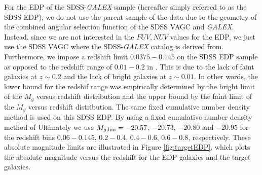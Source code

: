 \documentclass{emulateapj}
\begin{document}
For the EDP of the SDSS-{\em GALEX} sample (hereafter simply referred to as the SDSS EDP), 
we do not use the parent sample of the data due to 
the geometry of the combined angular selection function of the SDSS VAGC and {\em GALEX}. 
Instead, since we are not interested in the $FUV, NUV$ values for the EDP, we just use the
SDSS VAGC where the SDSS-{\em GALEX} catalog is derived from. 
Furthermore, we impose a redshift limit $0.0375-0.145$ on the SDSS EDP sample as opposed 
to the redshift range of $0.01-0.2$ in \cite{Moustakas:20133aa}.
This is due to the lack of faint galaxies at $z \sim 0.2$ and the lack of bright 
galaxies at $z \sim 0.01$. 
In other words, the lower bound for the redshif range was empirically determined by the bright limit of 
the $M_{g}$ versus redshift distribution and the upper bound by the faint limit of the 
$M_{g}$ versus redshift distribution. 
The same fixed cumulative number density method is used on this SDSS EDP. 
By using a fixed cumulative number density method of 
Ultimately we use $M_{g,\rm{lim}} = -20.57$, $-20.73$, $-20.80$ and $-20.95$ for the redshift bins 
$0.06-0.145$, $0.2-0.4$, $0.4-0.6$, $0.6-0.8$, respectively. 
These absolute magnitude limits are illustrated in Figure \ref{fig:targetEDP}, which plots the absolute magnitude versus the redshift for the EDP galaxies and the target galaxies. 
\begin{figure*}
    \begin{center}
        \leavevmode
        \label{fig:targetEDP}
        \caption{Absolute magnitude $M_{g}$ vs. redshift for the target galaxy population (black) with the Environment Defining Population (red) plotted on top. Both samples are divided into redshift bins:$0.06-0.145$, $0.2-0.4$, $0.4-0.6$, and $0.6-0.8$. The target galaxy population is stellar mass complete (Section \ref{sec:target} while the EDP is volume limited through $M_{g}$ limits (Section \ref{sec:environment}).}
    \end{center}
\end{figure*}
\end{document}
